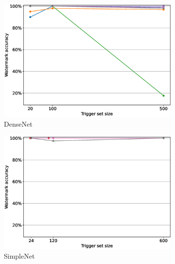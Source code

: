 \begin{figure}
    \centering
    \begin{subfigure}{0.4\linewidth}
        \includegraphics[width=\linewidth]{images/pruning/densenet_pruning_per_arch_maximal_pr_rate.eps}
        \caption{DenseNet}
        \label{fig:pruning-max-pr-rate-densenet}
    \end{subfigure}
    \quad
    \begin{subfigure}{0.4\linewidth}
        \includegraphics[width=\linewidth]{images/pruning/simplenet_mnist_pruning_per_arch_maximal_pr_rate.eps}
        \caption{SimpleNet}
        \label{fig:pruning-max-pr-rate-simplenet}
    \end{subfigure}
    \quad
    \begin{subfigure}{0.4\linewidth}

\end{subfigure}
\end{figure}
